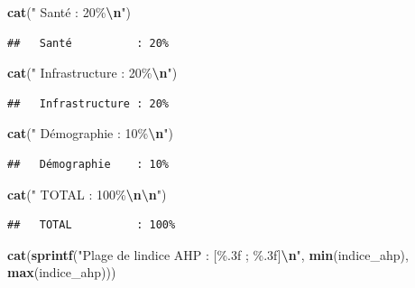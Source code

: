 \documentclass[
]{article}
\newenvironment{Shaded}{\begin{snugshade}}{\end{snugshade}}
\newcommand{\FunctionTok}[1]{\textcolor[rgb]{0.13,0.29,0.53}{\textbf{#1}}}
\newcommand{\NormalTok}[1]{#1}
\newcommand{\SpecialCharTok}[1]{\textcolor[rgb]{0.81,0.36,0.00}{\textbf{#1}}}
\newcommand{\StringTok}[1]{\textcolor[rgb]{0.31,0.60,0.02}{#1}}
\begin{document}
\begin{Shaded}
\begin{Highlighting}[]
\FunctionTok{cat}\NormalTok{(}\StringTok{"  Santé          : 20\%}\SpecialCharTok{\textbackslash{}n}\StringTok{"}\NormalTok{)}
\end{Highlighting}
\end{Shaded}

\begin{verbatim}
##   Santé          : 20%
\end{verbatim}

\begin{Shaded}
\begin{Highlighting}[]
\FunctionTok{cat}\NormalTok{(}\StringTok{"  Infrastructure : 20\%}\SpecialCharTok{\textbackslash{}n}\StringTok{"}\NormalTok{)}
\end{Highlighting}
\end{Shaded}

\begin{verbatim}
##   Infrastructure : 20%
\end{verbatim}

\begin{Shaded}
\begin{Highlighting}[]
\FunctionTok{cat}\NormalTok{(}\StringTok{"  Démographie    : 10\%}\SpecialCharTok{\textbackslash{}n}\StringTok{"}\NormalTok{)}
\end{Highlighting}
\end{Shaded}

\begin{verbatim}
##   Démographie    : 10%
\end{verbatim}

\begin{Shaded}
\begin{Highlighting}[]
\FunctionTok{cat}\NormalTok{(}\StringTok{"  TOTAL          : 100\%}\SpecialCharTok{\textbackslash{}n\textbackslash{}n}\StringTok{"}\NormalTok{)}
\end{Highlighting}
\end{Shaded}

\begin{verbatim}
##   TOTAL          : 100%
\end{verbatim}

\begin{Shaded}
\begin{Highlighting}[]
\FunctionTok{cat}\NormalTok{(}\FunctionTok{sprintf}\NormalTok{(}\StringTok{"Plage de l\textquotesingle{}indice AHP : [\%.3f ; \%.3f]}\SpecialCharTok{\textbackslash{}n}\StringTok{"}\NormalTok{,}
            \FunctionTok{min}\NormalTok{(indice\_ahp), }\FunctionTok{max}\NormalTok{(indice\_ahp)))}
\end{Highlighting}
\end{Shaded}
\end{document}
